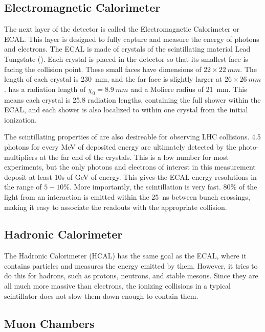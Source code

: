 \subsection{Electromagnetic Calorimeter}

The next layer of the detector is called the Electromagnetic Calorimeter or ECAL.
This layer is designed to fully capture and measure the energy of photons and electrons.
The ECAL is made of crystals of the scintillating material Lead Tungstate ().
Each crystal is placed in the detector so that its smallest face is facing the collision point.
These small faces have dimensions of $22\times\SI{22}{mm}$.
The length of each crystal is \SI{230}{mm},
and the far face is slightly larger at $26\times\SI{26}{mm}$.
 has a radiation length of $\chi_0 = \SI{8.9}{mm}$ and a Moliere radius of \SI{21}{mm}.
This means each crystal is 25.8 radiation lengths, containing the full shower within the ECAL,
and each shower is also localized to within one crystal from the initial ionization.

The scintillating properties of  are also desireable for observing LHC collisions.
4.5 photons for every MeV of deposited energy are ultimately detected by the photo-multipliers at the far end of the crystals.
This is a low number for most experiments, but the only photons and electrons of interest in this measurement deposit at least 10s of GeV of energy.
This gives the ECAL energy resolutions in the range of $5-10\%$.
More importantly, the scintillation is very fast.
80\% of the light from an interaction is emitted within the \SI{25}{ns} between bunch crossings,
making it easy to associate the readouts with the appropriate collision.

\subsection{Hadronic Calorimeter}

The Hadronic Calorimeter (HCAL) has the same goal as the ECAL,
where it contains particles and measures the energy emitted by them.
However, it tries to do this for hadrons, such as protons, neutrons, and stable mesons.
Since they are all much more massive than electrons,
the ionizing collisions in a typical scintillator does not slow them down enough to contain them.


\subsection{Muon Chambers}

